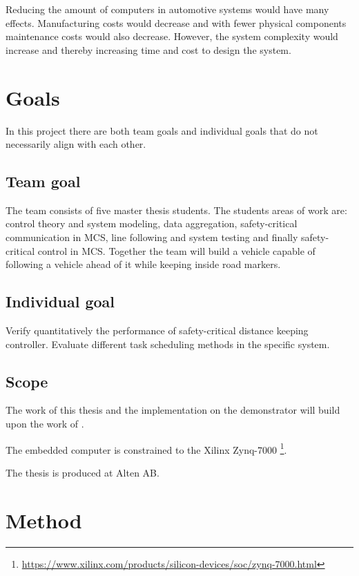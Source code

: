 Reducing the amount of computers in automotive systems would have many effects. Manufacturing costs would decrease and with fewer physical components maintenance costs would also decrease. However, the system complexity would increase and thereby increasing time and cost to design the system. %


\section{Goals}
In this project there are both team goals and individual goals that do not necessarily align with each other. 

\subsection{Team goal}
The team consists of five master thesis students. The students areas of work are: control theory and system modeling, data aggregation, safety-critical communication in MCS, line following and system testing and finally safety-critical control in MCS. Together the team will build a vehicle capable of following a vehicle ahead of it while keeping inside road markers.

\subsection{Individual goal}
Verify quantitatively the performance of safety-critical distance keeping controller. Evaluate different task scheduling methods in the specific system.

\subsection{Scope}
The work of this thesis and the implementation on the demonstrator will build upon the work of \cite{zaki2016}.

The embedded computer is constrained to the Xilinx Zynq-7000 \footnote{\url{https://www.xilinx.com/products/silicon-devices/soc/zynq-7000.html}}. 

The thesis is produced at Alten AB.

\section{Method}

